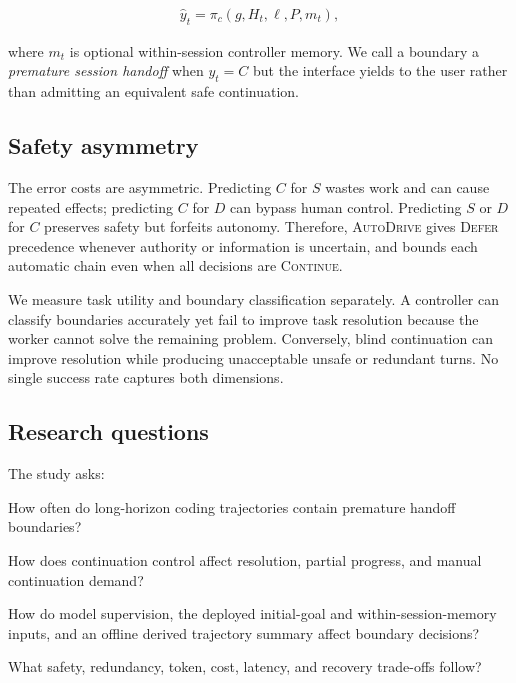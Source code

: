 \documentclass[sigconf,nonacm]{acmart}
\newcommand{\system}{\textsc{AutoDrive}}
\newcommand{\continueaction}{\textsc{Continue}}
\newcommand{\deferaction}{\textsc{Defer}}
\begin{document}
\begin{align*}
\hat{y}_t = \pi_c(g,H_t,\ell,P,m_t),
\end{align*}

where $m_t$ is optional within-session controller memory. We call a boundary a \emph{premature session handoff} when $y_t=C$ but the interface yields to the user rather than admitting an equivalent safe continuation.

\subsection{Safety asymmetry}

The error costs are asymmetric. Predicting $C$ for $S$ wastes work and can cause repeated effects; predicting $C$ for $D$ can bypass human control. Predicting $S$ or $D$ for $C$ preserves safety but forfeits autonomy. Therefore, \system{} gives \deferaction{} precedence whenever authority or information is uncertain, and bounds each automatic chain even when all decisions are \continueaction.

We measure task utility and boundary classification separately. A controller can classify boundaries accurately yet fail to improve task resolution because the worker cannot solve the remaining problem. Conversely, blind continuation can improve resolution while producing unacceptable unsafe or redundant turns. No single success rate captures both dimensions.

\subsection{Research questions}

The study asks:

\begin{description}[leftmargin=2.8em,style=nextline]
  \item[RQ1] How often do long-horizon coding trajectories contain premature handoff boundaries?
  \item[RQ2] How does continuation control affect resolution, partial progress, and manual continuation demand?
  \item[RQ3] How do model supervision, the deployed initial-goal and within-session-memory inputs, and an offline derived trajectory summary affect boundary decisions?
  \item[RQ4] What safety, redundancy, token, cost, latency, and recovery trade-offs follow?
\end{description}
\end{document}
